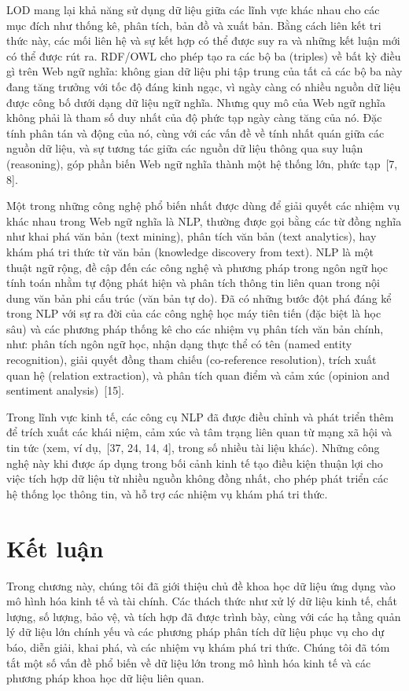 LOD mang lại khả năng sử dụng dữ liệu giữa các lĩnh vực khác nhau cho các mục đích như thống kê, phân tích, bản đồ và xuất bản. Bằng cách liên kết tri thức này, các mối liên hệ và sự kết hợp có thể được suy ra và những kết luận mới có thể được rút ra. RDF/OWL cho phép tạo ra các bộ ba (triples) về bất kỳ điều gì trên Web ngữ nghĩa: không gian dữ liệu phi tập trung của tất cả các bộ ba này đang tăng trưởng với tốc độ đáng kinh ngạc, vì ngày càng có nhiều nguồn dữ liệu được công bố dưới dạng dữ liệu ngữ nghĩa. Nhưng quy mô của Web ngữ nghĩa không phải là tham số duy nhất của độ phức tạp ngày càng tăng của nó. Đặc tính phân tán và động của nó, cùng với các vấn đề về tính nhất quán giữa các nguồn dữ liệu, và sự tương tác giữa các nguồn dữ liệu thông qua suy luận (reasoning), góp phần biến Web ngữ nghĩa thành một hệ thống lớn, phức tạp~[7, 8].

Một trong những công nghệ phổ biến nhất được dùng để giải quyết các nhiệm vụ khác nhau trong Web ngữ nghĩa là NLP, thường được gọi bằng các từ đồng nghĩa như khai phá văn bản (text mining), phân tích văn bản (text analytics), hay khám phá tri thức từ văn bản (knowledge discovery from text). NLP là một thuật ngữ rộng, đề cập đến các công nghệ và phương pháp trong ngôn ngữ học tính toán nhằm tự động phát hiện và phân tích thông tin liên quan trong nội dung văn bản phi cấu trúc (văn bản tự do). Đã có những bước đột phá đáng kể trong NLP với sự ra đời của các công nghệ học máy tiên tiến (đặc biệt là học sâu) và các phương pháp thống kê cho các nhiệm vụ phân tích văn bản chính, như: phân tích ngôn ngữ học, nhận dạng thực thể có tên (named entity recognition), giải quyết đồng tham chiếu (co-reference resolution), trích xuất quan hệ (relation extraction), và phân tích quan điểm và cảm xúc (opinion and sentiment analysis)~[15].

Trong lĩnh vực kinh tế, các công cụ NLP đã được điều chỉnh và phát triển thêm để trích xuất các khái niệm, cảm xúc và tâm trạng liên quan từ mạng xã hội và tin tức (xem, ví dụ,~[37, 24, 14, 4], trong số nhiều tài liệu khác). Những công nghệ này khi được áp dụng trong bối cảnh kinh tế tạo điều kiện thuận lợi cho việc tích hợp dữ liệu từ nhiều nguồn không đồng nhất, cho phép phát triển các hệ thống lọc thông tin, và hỗ trợ các nhiệm vụ khám phá tri thức.

\section{Kết luận}

Trong chương này, chúng tôi đã giới thiệu chủ đề khoa học dữ liệu ứng dụng vào mô hình hóa kinh tế và tài chính. Các thách thức như xử lý dữ liệu kinh tế, chất lượng, số lượng, bảo vệ, và tích hợp đã được trình bày, cùng với các hạ tầng quản lý dữ liệu lớn chính yếu và các phương pháp phân tích dữ liệu phục vụ cho dự báo, diễn giải, khai phá, và các nhiệm vụ khám phá tri thức. Chúng tôi đã tóm tắt một số vấn đề phổ biến về dữ liệu lớn trong mô hình hóa kinh tế và các phương pháp khoa học dữ liệu liên quan.

